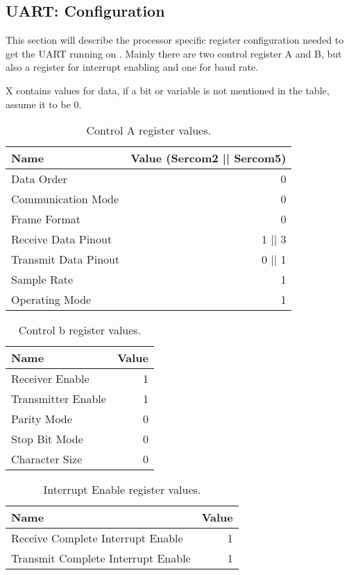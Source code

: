 \subsection{UART: Configuration}
This section will describe the processor specific register configuration needed to get the UART running on \SAMD. Mainly there are two control register A and B, but also a register for interrupt enabling and one for baud rate.

X contains values for data, if a bit or variable is not mentioned in the table, assume it to be 0.

\begin{table}[H]
	\begin{tabular}{lr}
		\toprule
		Name & Value (Sercom2 || Sercom5) \\
		\midrule
		Data Order & 0 \\ 
		Communication Mode & 0 \\ 
		Frame Format & 0 \\ 
		Receive Data Pinout & 1 || 3 \\ 
		Transmit Data Pinout & 0 || 1 \\ 
		Sample Rate & 1 \\ 
		Operating Mode & 1 \\ 
		\bottomrule
	\end{tabular} 
	\centering
	\caption{Control A register values.}
	\label{tab:UARTControlA}
\end{table}

\begin{table}[H]
	\begin{tabular}{lr}
		\toprule
		Name & Value \\
		\midrule
		Receiver Enable & 1 \\ 
		Transmitter Enable & 1 \\ 
		Parity Mode & 0 \\ 
		Stop Bit Mode & 0 \\ 
		Character Size & 0 \\ 
		\bottomrule
	\end{tabular} 
	\centering
	\caption{Control b register values.}
	\label{tab:UARTControlB}
\end{table}

\begin{table}[H]
	\begin{tabular}{lr}
		\toprule
		Name & Value \\
		\midrule
		Receive Complete Interrupt Enable & 1 \\ 
		Transmit Complete Interrupt Enable & 1 \\ 
		\bottomrule
	\end{tabular} 
	\centering
	\caption{Interrupt Enable register values.}
	\label{tab:UARTINTENSET}
\end{table}

